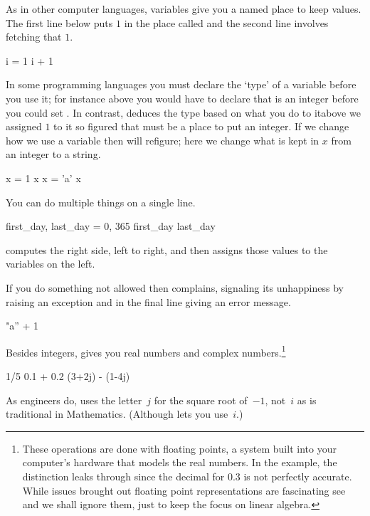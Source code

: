 As in other computer languages, 
variables give you a named place to keep values.
The first line below puts $1$ in the place called 
and the second line involves fetching that $1$.
\begin{pythonconsole}
i = 1
i + 1
\end{pythonconsole}
In some programming languages you must declare the `type' of a variable
before you use it; for instance above you would have to declare 
that  is an integer before you could set .
In contrast, \python{} deduces the type 
based on what you do to it\Dash above we assigned $1$ to it
so \python{} figured that  must be a place to put an integer.
If we change how we use a variable then \python{} will 
refigure; here we change what is kept in $x$ from an integer to a string.
\begin{pythonconsole}
x = 1
x
x = 'a'
x
\end{pythonconsole}

You can do multiple things on a single line.
\begin{pythonconsole}
first_day, last_day = 0, 365
first_day
last_day   
\end{pythonconsole}
\python{} computes the right side, left to right, and then assigns 
those values to the variables on the left.

If you do something not allowed then 
\python{} complains, signaling its unhappiness by 
raising an exception and in the final line giving an error 
message.
\begin{pythonconsole}
"a'' + 1
\end{pythonconsole}

Besides integers, 
\python{} gives you real numbers and complex numbers.\footnote{%
  These operations
  are done with floating points, a system 
  built into your computer's hardware that
  models the real numbers.
  In the example, the distinction leaks through
  since the decimal for $0.3$ is not perfectly accurate.
  While issues brought out floating point representations are fascinating\protect\Dash
  see \protect\cite{PythonTeam19a} and \protect\cite{Goldberg91}\protect\Dash
  we shall ignore them, just to keep the focus on 
  linear algebra.}
\begin{pythonconsole}
1/5
0.1 + 0.2
(3+2j) - (1-4j)
\end{pythonconsole}
As engineers do, \python{} uses the letter~$j$ for the square
root of~$-1$, not~$i$ as is traditional in Mathematics.
(Although \protect\Sage{} lets you use~$i$.)

